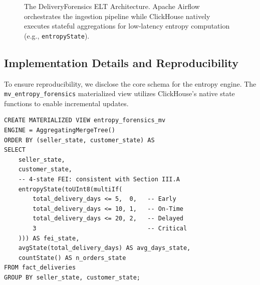 \documentclass[conference]{IEEEtran}
\begin{document}
\begin{figure}[htbp]
\centering
{}
\caption{The DeliveryForensics ELT Architecture. Apache Airflow orchestrates the ingestion pipeline while ClickHouse natively executes stateful aggregations for low-latency entropy computation (e.g., \texttt{entropyState}).}
\label{fig:architecture}
\end{figure}

\subsection{Implementation Details and Reproducibility}
To ensure reproducibility, we disclose the core schema for the entropy engine. The \texttt{mv\_entropy\_forensics} materialized view utilizes ClickHouse's native state functions to enable incremental updates.

\begin{lstlisting}[caption={Materialized View for Multi-state Entropy}, label={lst:entropy_mv}]
CREATE MATERIALIZED VIEW entropy_forensics_mv
ENGINE = AggregatingMergeTree()
ORDER BY (seller_state, customer_state) AS
SELECT
    seller_state,
    customer_state,
    -- 4-state FEI: consistent with Section III.A
    entropyState(toUInt8(multiIf(
        total_delivery_days <= 5,  0,   -- Early
        total_delivery_days <= 10, 1,   -- On-Time
        total_delivery_days <= 20, 2,   -- Delayed
        3                               -- Critical
    ))) AS fei_state,
    avgState(total_delivery_days) AS avg_days_state,
    countState() AS n_orders_state
FROM fact_deliveries
GROUP BY seller_state, customer_state;
\end{lstlisting}
\end{document}
